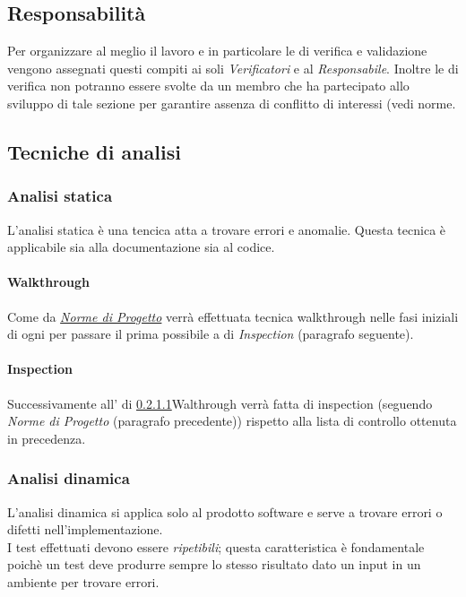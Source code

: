 \documentclass{scalatekids-article}
\begin{document}
\subsection{Responsabilità}
Per organizzare al meglio il lavoro e in particolare le  di verifica e validazione vengono assegnati questi compiti ai soli \textit{Verificatori} e al \textit{Responsabile}. Inoltre le  di verifica non potranno essere svolte da un membro che ha partecipato allo sviluppo di tale sezione per garantire assenza di conflitto di interessi (vedi norme.
\subsection{Tecniche di analisi}
\label{sec:TecnicheDiAnalisi}
\subsubsection{Analisi statica}
L'analisi statica è una tencica atta a trovare errori e anomalie. Questa tecnica è applicabile sia alla documentazione sia al codice.
\paragraph{Walkthrough}
\label{sec:walkthrough}Come da \textit{\href{run:../Interni/NormeDiProgetto_v1.0.0.pdf}{Norme di Progetto}} verrà effettuata tecnica walkthrough nelle fasi iniziali di ogni  per passare il prima possibile a  di \textit{Inspection} (paragrafo seguente).
\paragraph{Inspection}
\label{sec:inspection}Successivamente all' di \ref{sec:walkthrough}{Walthrough} verrà fatta  di inspection (seguendo \textit{Norme di Progetto} (paragrafo precedente)) rispetto alla lista di controllo ottenuta in precedenza.
\subsubsection{Analisi dinamica}
L'analisi dinamica si applica solo al prodotto software e serve a trovare errori o difetti nell'implementazione.\\I test effettuati devono essere \textit{ripetibili}; questa caratteristica è fondamentale poichè un test deve produrre sempre lo stesso risultato dato un input in un ambiente per trovare errori.
\end{document}
